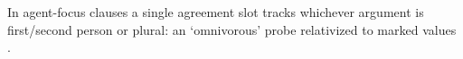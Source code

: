 
In agent-focus clauses a single agreement slot tracks whichever argument is first/second person or plural: an `omnivorous' probe relativized to marked values \citep{preminger2014}.

